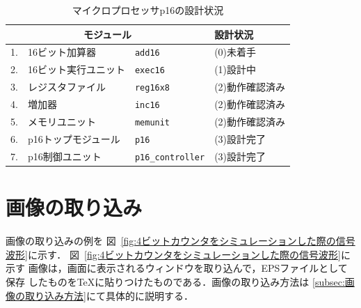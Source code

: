 \documentclass{jarticle}[11pt]
\begin{document}
%

\begin{table}[htb]
\caption{マイクロプロセッサp16の設計状況}
\label{tab:マイクロプロセッサp16の設計状況}
\begin{center}
{\small
\begin{tabular}{rll|l}
\hline
\hline
\multicolumn{3}{c|}{モジュール} & 設計状況 \\
\hline
1. & 16ビット加算器       & \verb|add16|          & (0)未着手 \\
2. & 16ビット実行ユニット & \verb|exec16|         & (1)設計中 \\
3. & レジスタファイル     & \verb|reg16x8|        & (2)動作確認済み \\
4. & 増加器               & \verb|inc16|          & (2)動作確認済み \\
5. & メモリユニット       & \verb|memunit|        & (2)動作確認済み \\
6. & p16トップモジュール  & \verb|p16|            & (3)設計完了 \\
7. & p16制御ユニット      & \verb|p16_controller| & (3)設計完了 \\
\hline
\end{tabular}
}
\end{center}
\end{table}

\section{画像の取り込み}
画像の取り込みの例を
図~\ref{fig:4ビットカウンタをシミュレーションした際の信号波形}に示す．
図~\ref{fig:4ビットカウンタをシミュレーションした際の信号波形}に示す
画像は，画面に表示されるウィンドウを取り込んで，EPSファイルとして保存
したものをTeXに貼りつけたものである．画像の取り込み方法は
\ref{subsec:画像の取り込み方法}にて具体的に説明する．
\end{document}
